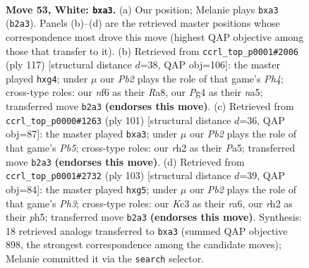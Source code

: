\documentclass[11pt]{article}
\begin{document}
\clearpage

\begin{figure}[p]\centering
\begin{subfigure}{0.46\textwidth}\centering
\resizebox{\linewidth}{!}{%
\newchessgame
\chessboard[
  setfen={8/R7/5nk1/1P1P4/2p3P1/p1K5/1P5r/8 w - - 0 53},
  showmover=false,
  pgfstyle=straightmove, color=movearrow, markmove={b2-a3}
]}
\caption{}
\end{subfigure}\hfill
\begin{subfigure}{0.46\textwidth}\centering
\resizebox{\linewidth}{!}{%
\newchessgame
\chessboard[
  setfen={r7/8/5k2/NR2bp1p/Pp4P1/8/5PK1/8 b - - 0 59},
  showmover=false,
  pgfstyle=straightmove, color=movearrow, markmove={h5-g4}
]}
\caption{}
\end{subfigure}
\\[4pt]
\begin{subfigure}{0.46\textwidth}\centering
\resizebox{\linewidth}{!}{%
\newchessgame
\chessboard[
  setfen={8/6K1/5p2/p3kPP1/1p6/P7/8/8 b - - 0 51},
  showmover=false,
  pgfstyle=straightmove, color=movearrow, markmove={b4-a3}
]}
\caption{}
\end{subfigure}\hfill
\begin{subfigure}{0.46\textwidth}\centering
\resizebox{\linewidth}{!}{%
\newchessgame
\chessboard[
  setfen={8/4k3/R4p1p/p5PP/6P1/r7/6K1/8 b - - 0 52},
  showmover=false,
  pgfstyle=straightmove, color=movearrow, markmove={h6-g5}
]}
\caption{}
\end{subfigure}
\caption{\textbf{Move 53, White: \texttt{bxa3}.} (a) Our position; Melanie plays \texttt{bxa3} (\texttt{b2a3}). Panels (b)--(d) are the retrieved master positions whose correspondence most drove this move (highest QAP objective among those that transfer to it). (b) Retrieved from \texttt{ccrl\_top\_p0001\#2006} (ply 117) [structural distance $d$=38, QAP obj=106]: the master played \texttt{hxg4}; under $\mu$ our \emph{Pb2} plays the role of that game's \emph{Ph4}; cross-type roles: our \emph{n}f6 as their \emph{R}a8, our \emph{P}g4 as their \emph{n}a5; transferred move \texttt{b2a3} \textbf{(endorses this move)}. (c) Retrieved from \texttt{ccrl\_top\_p0000\#1263} (ply 101) [structural distance $d$=36, QAP obj=87]: the master played \texttt{bxa3}; under $\mu$ our \emph{Pb2} plays the role of that game's \emph{Pb5}; cross-type roles: our \emph{r}h2 as their \emph{P}a5; transferred move \texttt{b2a3} \textbf{(endorses this move)}. (d) Retrieved from \texttt{ccrl\_top\_p0001\#2732} (ply 103) [structural distance $d$=39, QAP obj=84]: the master played \texttt{hxg5}; under $\mu$ our \emph{Pb2} plays the role of that game's \emph{Ph3}; cross-type roles: our \emph{K}c3 as their \emph{r}a6, our \emph{r}h2 as their \emph{p}h5; transferred move \texttt{b2a3} \textbf{(endorses this move)}. Synthesis: 18 retrieved analogs transferred to \texttt{bxa3} (summed QAP objective 898, the strongest correspondence among the candidate moves); Melanie committed it via the \texttt{search} selector.}
\label{fig:thought-m104}
\end{figure}
\end{document}
